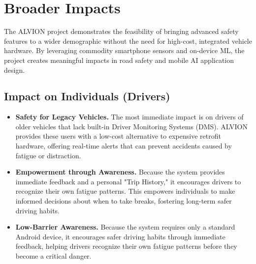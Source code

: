 \documentclass[11pt]{report}
\begin{document}
\section{Broader Impacts}\label{sec:impacts}

The ALVION project demonstrates the feasibility of bringing advanced safety features to a wider demographic without the need for high-cost, integrated vehicle hardware. By leveraging commodity smartphone sensors and on-device ML, the project creates meaningful impacts in road safety and mobile AI application design.

\subsection*{Impact on Individuals (Drivers)}
\begin{itemize}
    \item \textbf{Safety for Legacy Vehicles.} The most immediate impact is on drivers of older vehicles that lack built-in Driver Monitoring Systems (DMS). ALVION provides these users with a low-cost alternative to expensive retrofit hardware, offering real-time alerts that can prevent accidents caused by fatigue or distraction.
    \item \textbf{Empowerment through Awareness.} Because the system provides immediate feedback and a personal "Trip History," it encourages drivers to recognize their own fatigue patterns. This empowers individuals to make informed decisions about when to take breaks, fostering long-term safer driving habits.
    \item \textbf{Low-Barrier Awareness.} Because the system requires only a standard Android device, it encourages safer driving habits through immediate feedback, helping drivers recognize their own fatigue patterns before they become a critical danger.
\end{itemize}
\end{document}
